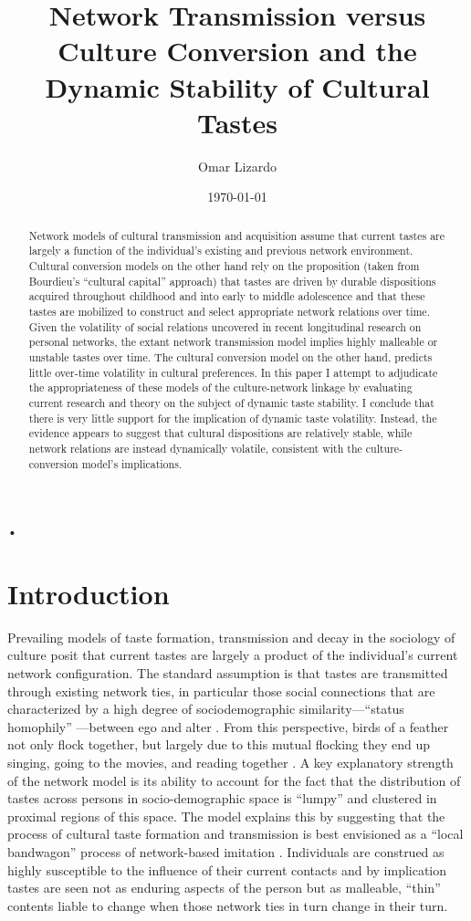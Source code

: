 \documentclass[11pt]{article}
\title{Network Transmission versus Culture Conversion and the Dynamic Stability of Cultural Tastes}
\author{Omar Lizardo}
\date{\today}
\begin{document}
\maketitle

\newpage
\begin{abstract}
Network models of cultural transmission and acquisition assume that current tastes are largely a function of the individual's existing and previous network environment.  Cultural conversion models on the other hand rely on the proposition (taken from Bourdieu's ``cultural capital'' approach) that tastes are driven by durable dispositions acquired throughout childhood and into early to middle adolescence and that these tastes are mobilized to construct and select appropriate network relations over time.  Given the volatility of social relations uncovered in recent longitudinal research on personal networks, the extant network transmission model implies highly malleable or unstable tastes over time.  The cultural conversion model on the other hand, predicts little over-time volatility in cultural preferences.  In this paper I attempt to adjudicate the appropriateness of these models of the culture-network linkage by evaluating current research and theory on the subject of dynamic taste stability.  I conclude that there is very little support for the implication of dynamic taste volatility.  Instead, the evidence appears to suggest that cultural dispositions are relatively stable, while network relations are instead dynamically volatile, consistent with the culture-conversion model's implications.  
\end{abstract}•

\newpage
\onehalfspacing
\section{Introduction}
\label{sec:intro}

Prevailing models of taste formation, transmission and decay in the sociology of culture posit that current tastes are largely a product of the individual's current network configuration.  The standard assumption is that tastes are transmitted through existing network ties, in particular those social connections that are characterized by a high degree of sociodemographic similarity---``status homophily'' \citep{lazarsfeld_merton54}---between ego and alter \citep{mcpherson_etal01}.  From this perspective, birds of a feather not only flock together, but largely due to this mutual flocking they end up singing, going to the movies, and reading together \citep{mark98b, mark03}. A key explanatory strength of the network model is its ability to account for the fact that the distribution of tastes across persons in socio-demographic space is ``lumpy'' and clustered in proximal regions of this space.  The model explains this by suggesting that the process of cultural taste formation and transmission is best envisioned as a ``local bandwagon'' process of network-based imitation \citep{mark03}. Individuals are construed as highly susceptible to the influence of their current contacts and by implication tastes are seen not as enduring aspects of the person but as malleable, ``thin'' contents liable to change when those network ties in turn change in their turn.  
\end{document}
